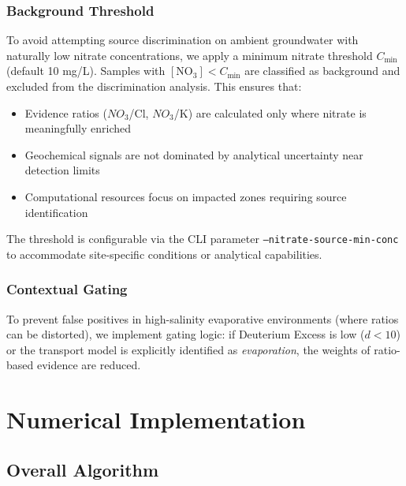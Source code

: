 \documentclass[12pt,a4paper]{article}
\theoremstyle{plain}
\theoremstyle{definition}
\theoremstyle{remark}
\begin{document}
\subsubsection{Background Threshold}
To avoid attempting source discrimination on ambient groundwater with naturally low nitrate concentrations, we apply a minimum nitrate threshold $C_{\min}$ (default 10 mg/L). Samples with $[\text{NO}_3] < C_{\min}$ are classified as background and excluded from the discrimination analysis. This ensures that:
\begin{itemize}
	\item Evidence ratios ($NO_3$/Cl, $NO_3$/K) are calculated only where nitrate is meaningfully enriched
	\item Geochemical signals are not dominated by analytical uncertainty near detection limits
	\item Computational resources focus on impacted zones requiring source identification
\end{itemize}

The threshold is configurable via the CLI parameter \texttt{--nitrate-source-min-conc} to accommodate site-specific conditions or analytical capabilities.

\subsubsection{Contextual Gating}
To prevent false positives in high-salinity evaporative environments (where ratios can be distorted), we implement gating logic: if Deuterium Excess is low ($d < 10$) or the transport model is explicitly identified as \textit{evaporation}, the weights of ratio-based evidence are reduced.
\newpage
\section{Numerical Implementation}\label{sec:numerical}

\subsection{Overall Algorithm}
\end{document}
